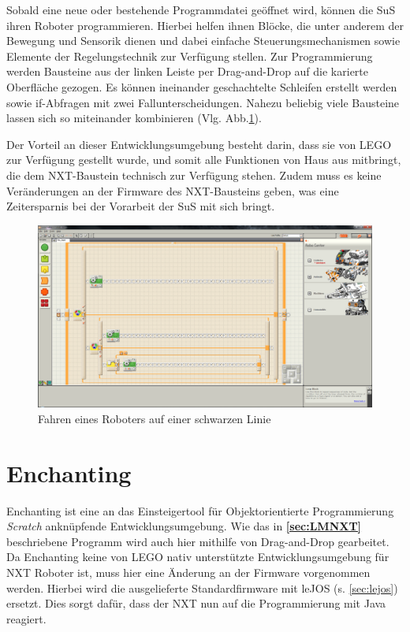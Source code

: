 \documentclass[paper=a4, DIV=calc, BCOR=12mm, twoside=on, onecolumn=on, open = right, titlepage =on, parskip =half-, headsepline = on, footsepline = off, chapterprefix = off, appendixprefix = on, fontsize = 12pt, numbers = noenddot, abstract = on]{scrbook}
\begin{document}
Sobald eine neue oder bestehende Programmdatei geöffnet wird, können die SuS ihren Roboter programmieren. Hierbei helfen ihnen Blöcke, die unter anderem der Bewegung und Sensorik dienen und dabei einfache Steuerungsmechanismen sowie Elemente der Regelungstechnik zur Verfügung stellen. Zur Programmierung werden Bausteine aus der linken Leiste per Drag-and-Drop auf die karierte Oberfläche gezogen. Es können ineinander geschachtelte Schleifen erstellt werden sowie if-Abfragen mit zwei Fallunterscheidungen. Nahezu beliebig viele Bausteine lassen sich so miteinander kombinieren (Vlg. Abb.\ref{fig:Bsp NXT}).

Der Vorteil an dieser Entwicklungsumgebung besteht darin, dass sie von \textsc{LEGO} zur Verfügung gestellt wurde, und somit alle Funktionen von Haus aus mitbringt, die dem NXT-Baustein technisch zur Verfügung stehen. Zudem muss es keine Veränderungen an der Firmware des NXT-Bausteins geben, was eine Zeitersparnis bei der Vorarbeit der SuS mit sich bringt.

\begin{figure}[htbp]
\centering
\includegraphics[width=\textwidth]{images/Beispielprogramm_NXT.png} 
\caption{Fahren eines Roboters auf einer schwarzen Linie}
\label{fig:Bsp NXT}
\end{figure}

\vspace*{2ex}
\section{Enchanting}
\label{sec:enchanting}
Enchanting ist eine an das Einsteigertool für Objektorientierte Programmierung \emph{Scratch} anknüpfende Entwicklungsumgebung. Wie das in \textbf{\ref{sec:LMNXT}} beschriebene Programm wird auch hier mithilfe von Drag-and-Drop gearbeitet. Da Enchanting keine von LEGO nativ unterstützte Entwicklungsumgebung für NXT Roboter ist, muss hier eine Änderung an der Firmware vorgenommen werden. Hierbei wird die ausgelieferte Standardfirmware mit leJOS (s. \ref{sec:lejos}) ersetzt. Dies sorgt dafür, dass der NXT nun auf die Programmierung mit Java reagiert.
\end{document}
